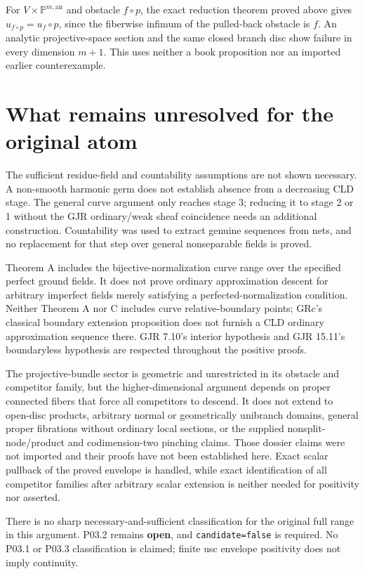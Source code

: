 \documentclass[
  11pt,
]{article}
\begin{document}
For \(V\times\mathbb P^{m,\mathrm{an}}\) and obstacle \(f\circ p\), the
exact reduction theorem proved above gives \(u_{f\circ p}=u_f\circ p\),
since the fiberwise infimum of the pulled-back obstacle is \(f\). An
analytic projective-space section and the same closed branch disc show
failure in every dimension \(m+1\). This uses neither a book proposition
nor an imported earlier counterexample.

\section{What remains unresolved for the original
atom}\label{what-remains-unresolved-for-the-original-atom}

The sufficient residue-field and countability assumptions are not shown
necessary. A non-smooth harmonic germ does not establish absence from a
decreasing CLD stage. The general curve argument only reaches stage 3;
reducing it to stage 2 or 1 without the GJR ordinary/weak sheaf
coincidence needs an additional construction. Countability was used to
extract genuine sequences from nets, and no replacement for that step
over general nonseparable fields is proved.

Theorem A includes the bijective-normalization curve range over the
specified perfect ground fields. It does not prove ordinary
approximation descent for arbitrary imperfect fields merely satisfying a
perfected-normalization condition. Neither Theorem A nor C includes
curve relative-boundary points; GRc's classical boundary extension
proposition does not furnish a CLD ordinary approximation sequence
there. GJR 7.10's interior hypothesis and GJR 15.11's boundaryless
hypothesis are respected throughout the positive proofs.

The projective-bundle sector is geometric and unrestricted in its
obstacle and competitor family, but the higher-dimensional argument
depends on proper connected fibers that force all competitors to
descend. It does not extend to open-disc products, arbitrary normal or
geometrically unibranch domains, general proper fibrations without
ordinary local sections, or the supplied nonsplit-node/product and
codimension-two pinching claims. Those dossier claims were not imported
and their proofs have not been established here. Exact scalar pullback
of the proved envelope is handled, while exact identification of all
competitor families after arbitrary scalar extension is neither needed
for positivity nor asserted.

There is no sharp necessary-and-sufficient classification for the
original full range in this argument. P03.2 remains \textbf{open}, and
\texttt{candidate=false} is required. No P03.1 or P03.3 classification
is claimed; finite usc envelope positivity does not imply continuity.
\end{document}
